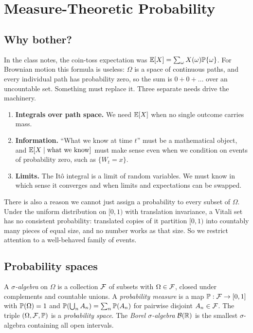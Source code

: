 \chapter{Measure-Theoretic Probability}\label{ch:measure}

\section{Why bother?}

In the class notes, the coin-toss expectation was $\mathbb{E}[X]=\sum_\omega X(\omega)\mathbb{P}\{\omega\}$. For Brownian motion this formula is useless: $\Omega$ is a space of continuous paths, and every individual path has probability zero, so the sum is $0+0+\dots$ over an uncountable set. Something must replace it. Three separate needs drive the machinery.

\begin{enumerate}
\item \textbf{Integrals over path space.} We need $\mathbb{E}[X]$ when no single outcome carries mass.
\item \textbf{Information.} ``What we know at time $t$'' must be a mathematical object, and $\mathbb{E}[X\mid\text{what we know}]$ must make sense even when we condition on events of probability zero, such as $\{W_t=x\}$.
\item \textbf{Limits.} The It\^o integral is a limit of random variables. We must know in which sense it converges and when limits and expectations can be swapped.
\end{enumerate}

There is also a reason we cannot just assign a probability to every subset of $\Omega$. Under the uniform distribution on $[0,1)$ with translation invariance, a Vitali set has no consistent probability: translated copies of it partition $[0,1)$ into countably many pieces of equal size, and no number works as that size. So we restrict attention to a well-behaved family of events.

\section{Probability spaces}

\begin{definition}
A \emph{$\sigma$-algebra} on $\Omega$ is a collection $\mathcal{F}$ of subsets with $\Omega\in\mathcal{F}$, closed under complements and countable unions. A \emph{probability measure} is a map $\mathbb{P}:\mathcal{F}\to[0,1]$ with $\mathbb{P}(\Omega)=1$ and $\mathbb{P}(\bigcup_n A_n)=\sum_n\mathbb{P}(A_n)$ for pairwise disjoint $A_n\in\mathcal{F}$. The triple $(\Omega,\mathcal{F},\mathbb{P})$ is a \emph{probability space}. The \emph{Borel $\sigma$-algebra} $\mathcal{B}(\mathbb{R})$ is the smallest $\sigma$-algebra containing all open intervals.
\end{definition}

